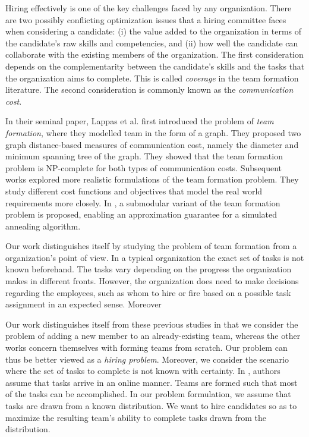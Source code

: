 Hiring effectively is one of the key challenges faced by any organization.
There are two possibly conflicting optimization issues that a hiring committee faces when considering a candidate: 
(i) the value added to the organization in terms of the candidate's raw skills and competencies, and 
(ii) how well the candidate can collaborate with the existing members of the organization.
The first consideration depends on the complementarity between the candidate's skills and the tasks that the organization aims to complete. 
This is called \textit{coverage} in the team formation literature.
The second consideration is commonly known as the \textit{communication cost}.

In their seminal paper, Lappas et al. \cite{lappas2009finding} first introduced the problem of \textit{team formation}, where they modelled team in the form of a graph.
They proposed two graph distance-based measures of communication cost, namely the diameter and minimum spanning tree of the graph. 
They showed that the team formation problem is NP-complete for both types of communication costs. 
Subsequent works \cite{sozio2010community, kargar2011discovering, anagnostopoulos2010power, rangapuram2013towards} explored more realistic formulations of the team  formation problem. They study different cost functions and objectives that model the real world requirements more closely.
In \cite{bhowmik2014submodularity}, a submodular variant of the team formation problem is proposed, enabling an approximation guarantee for a simulated annealing algorithm.

Our work distinguishes itself by studying the problem of team formation from a organization's point of view. In a typical organization the exact set of tasks is not known beforehand. The tasks vary depending on the progress the organization makes in different fronts. However, the organization does need to make decisions regarding the employees, such as whom to hire or fire based on a possible task assignment in an expected sense. Moreover  

Our work distinguishes itself from these previous studies in that we consider the problem of adding a new member to an already-existing team, whereas the other works concern themselves with forming teams from scratch.
Our problem can thus be better viewed as a \textit{hiring problem}. Moreover, we consider the scenario where the set of tasks to complete is not known with certainty.
In \cite{anagnostopoulos2012online}, authors assume that tasks arrive in an online manner.
Teams are formed such that most of the tasks can be accomplished.
In our problem formulation, we assume that tasks are drawn from a known distribution.
We want to hire candidates so as to maximize the resulting team's ability to complete tasks drawn from the distribution.

